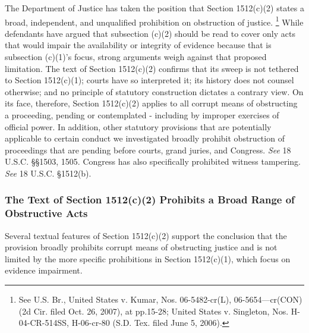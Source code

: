 The Department of Justice has taken the position that Section 1512(c)(2) states a broad, independent, and unqualified prohibition on obstruction of justice.%
\footnote{See U.S. Br., United States v. Kumar, Nos. 06-5482-cr(L), 06-5654—cr(CON) (2d Cir. filed Oct. 26, 2007), at pp.15-28; United States v. Singleton, Nos. H-04-CR-514SS, H-06-cr-80 (S.D. Tex. filed June 5, 2006).}
While defendants have argued that subsection (c)(2) should be read to cover only acts that would impair the availability or integrity of evidence because that is subsection (c)(1)’s focus, strong arguments weigh against that proposed limitation.
The text of Section 1512(c)(2) confirms that its sweep is not tethered to Section 1512(c)(1); courts have so interpreted it; its history does not counsel otherwise; and no principle of statutory construction dictates a contrary view.
On its face, therefore, Section 1512(c)(2) applies to all corrupt means of obstructing a proceeding, pending or contemplated - including by improper exercises of official power.
In addition, other statutory provisions that are potentially applicable to certain conduct we investigated broadly prohibit obstruction of proceedings that are pending before courts, grand juries, and Congress.
\textit{See} 18 U.S.C. \S\S 1503, 1505.
Congress has also specifically prohibited witness tampering.
\textit{See} 18 U.S.C. \S 1512(b).

\subsubsection{The Text of Section 1512(c)(2) Prohibits a Broad Range of Obstructive Acts}

Several textual features of Section 1512(c)(2) support the conclusion that the provision broadly prohibits corrupt means of obstructing justice and is not limited by the more specific prohibitions in Section 1512(c)(1), which focus on evidence impairment.

